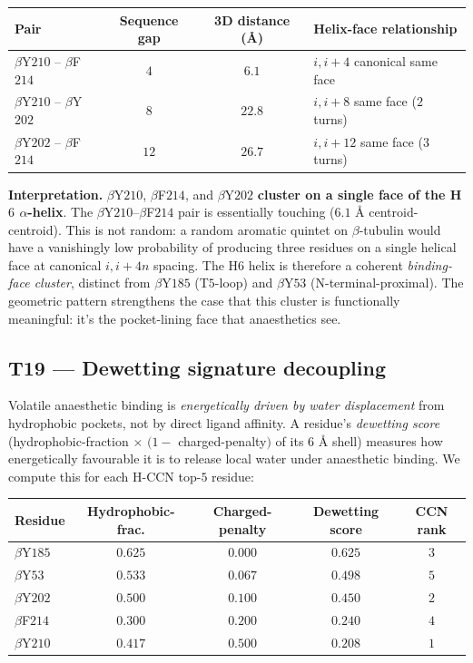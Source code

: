 \documentclass[11pt,a4paper]{article}
\begin{document}
\begin{center}
\begin{tabular}{lccl}\toprule
Pair & Sequence gap & 3D distance (\AA) & Helix-face relationship \\\midrule
$\beta$Y$210$ -- $\beta$F$214$ & $4$ & $6.1$ & $i, i+4$ canonical same face \\
$\beta$Y$210$ -- $\beta$Y$202$ & $8$ & $22.8$ & $i, i+8$ same face ($2$ turns) \\
$\beta$Y$202$ -- $\beta$F$214$ & $12$ & $26.7$ & $i, i+12$ same face ($3$ turns) \\
\bottomrule\end{tabular}
\end{center}

\textbf{Interpretation.} $\beta$Y$210$, $\beta$F$214$, and
$\beta$Y$202$ \textbf{cluster on a single face of the H$6$ $\alpha$-helix}.
The $\beta$Y$210$--$\beta$F$214$ pair is essentially touching
($6.1$ \AA{} centroid-centroid). This is not random: a random aromatic
quintet on $\beta$-tubulin would have a vanishingly low probability of
producing three residues on a single helical face at canonical $i, i+4n$
spacing. The H$6$ helix is therefore a coherent \emph{binding-face
cluster}, distinct from $\beta$Y$185$ (T$5$-loop) and $\beta$Y$53$
(N-terminal-proximal). The geometric pattern strengthens the case that
this cluster is functionally meaningful: it's the pocket-lining face
that anaesthetics see.

\subsection{\textsf{T19} --- Dewetting signature decoupling}\label{ssec:t19}

Volatile anaesthetic binding is \emph{energetically driven by water
displacement} from hydrophobic pockets, not by direct ligand affinity.
A residue's \emph{dewetting score} (hydrophobic-fraction $\times$
$(1 -$ charged-penalty$)$ of its $6$ \AA{} shell) measures how
energetically favourable it is to release local water under
anaesthetic binding. We compute this for each H-CCN top-$5$ residue:

\begin{center}
\begin{tabular}{lcccc}\toprule
Residue & Hydrophobic-frac. & Charged-penalty & Dewetting score & CCN rank \\\midrule
$\beta$Y$185$ & $0.625$ & $0.000$ & $\mathbf{0.625}$ & $3$ \\
$\beta$Y$53$  & $0.533$ & $0.067$ & $0.498$ & $5$ \\
$\beta$Y$202$ & $0.500$ & $0.100$ & $0.450$ & $2$ \\
$\beta$F$214$ & $0.300$ & $0.200$ & $0.240$ & $4$ \\
$\beta$Y$210$ & $0.417$ & $0.500$ & $0.208$ & $1$ \\
\bottomrule\end{tabular}
\end{center}
\end{document}
